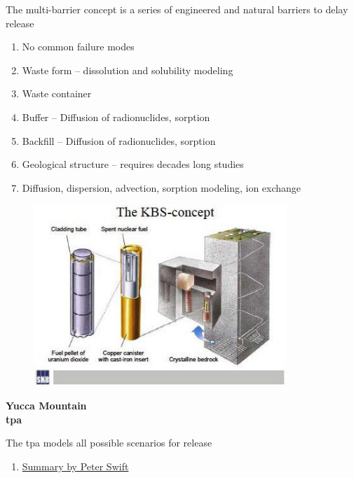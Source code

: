 \documentclass[aspectratio=1610,pdftex,dvipsnames,compress,xcolor={dvipsnames}]{beamer}
\newcommand{\acf}{\acrfull} %
\newcommand{\acs}{\acrshort} %
\begin{document}
\begin{frame}{The multi-barrier concept is a series of engineered and natural barriers to delay release}
    \begin{enumerate}[series=outerlist,topsep=0pt,itemsep=21pt,leftmargin=*,label=(\arabic*)]
        \item[]No common failure modes
        \item[]Waste form -- dissolution and solubility modeling
        \item[]Waste container
        \item[]Buffer -- Diffusion of radionuclides, sorption
        \item[]Backfill -- Diffusion of radionuclides, sorption
        \item[]Geological structure -- requires decades long studies
        \item[]Diffusion, dispersion, advection, sorption modeling, ion exchange
    \end{enumerate}
\end{frame}


\begin{frame}{}
    \begin{figure}
        \centering
        \includegraphics[width=0.85\textwidth]{kbs.canister.jpg}
    \end{figure}
\end{frame}


\begin{frame}[plain]{}
    \centering\LARGE\textbf{Yucca Mountain}\\
    \centering\LARGE\textbf{\acf{tpa}}
\end{frame}


\addtocounter{framenumber}{-1} 
\begin{frame}{The \acs{tpa} models all possible scenarios for release }
    \begin{enumerate}[resume=blue,topsep=0pt,itemsep=21pt,leftmargin=*,label=(\arabic*)]
        \item[]\href{https://www.osti.gov/servlets/purl/1142603}{Summary by Peter Swift}
    \end{enumerate}
\end{frame}
\end{document}
